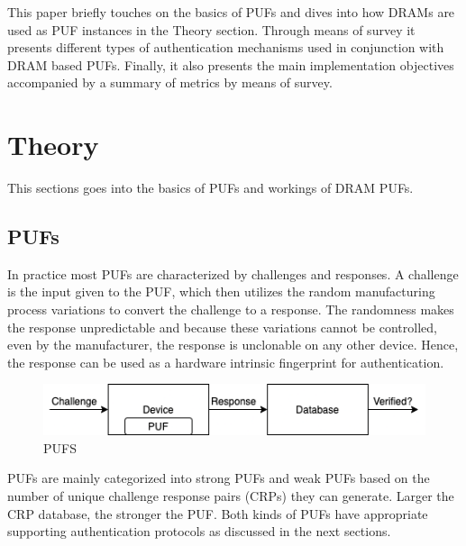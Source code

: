 \documentclass[journal, a4paper]{IEEEtran}
\begin{document}
This paper briefly touches on the basics of PUFs and dives into how DRAMs are used as PUF instances in the Theory section. Through means of survey it presents different types of authentication mechanisms used in conjunction with DRAM based PUFs. Finally, it also presents the main implementation objectives accompanied by a summary of metrics by means of survey.

\section{Theory}
This sections goes into the basics of PUFs and workings of DRAM PUFs.

\subsection{PUFs}
In practice most PUFs are characterized by challenges and responses. A challenge is the input given to the PUF, which then utilizes the random manufacturing process variations to convert the challenge to a response. The randomness makes the response unpredictable and because these variations cannot be controlled, even by the manufacturer, the response is unclonable on any other device. Hence, the response can be used as a hardware intrinsic fingerprint for authentication.

\begin{figure}[!hbt]
    \begin{center}
    \includegraphics[scale=0.5]{figs/PUF.png}
    \caption{PUFS}
    \label{fig:tf_plot}
    \end{center}
\end{figure}

PUFs are mainly categorized into strong PUFs and weak PUFs based on the number of unique challenge response pairs (CRPs) they can generate. Larger the CRP database, the stronger the PUF. Both kinds of PUFs have appropriate supporting authentication protocols as discussed in the next sections.
\end{document}
